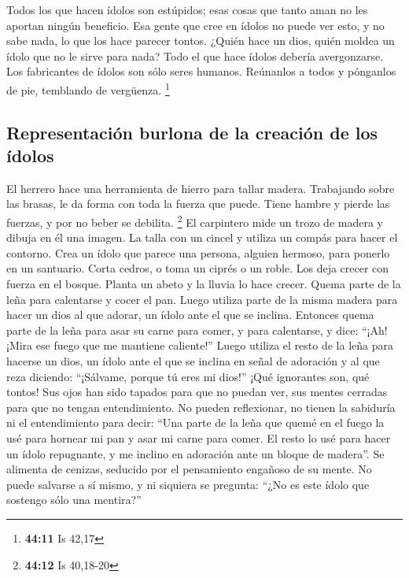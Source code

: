  Todos los que hacen ídolos son estúpidos; esas cosas que
tanto aman no les aportan ningún beneficio. Esa gente que cree en ídolos
no puede ver esto, y no sabe nada, lo que los hace parecer tontos.
 ¿Quién hace un dios, quién moldea un ídolo que no le
sirve para nada?  Todo el que hace ídolos debería
avergonzarse. Los fabricantes de ídolos son sólo seres humanos.
Reúnanlos a todos y pónganlos de pie, temblando de vergüenza.
\footnote{\textbf{44:11} Is 42,17}

\hypertarget{representaciuxf3n-burlona-de-la-creaciuxf3n-de-los-uxeddolos}{%
\subsection{Representación burlona de la creación de los
ídolos}\label{representaciuxf3n-burlona-de-la-creaciuxf3n-de-los-uxeddolos}}

 El herrero hace una herramienta de hierro para tallar
madera. Trabajando sobre las brasas, le da forma con toda la fuerza que
puede. Tiene hambre y pierde las fuerzas, y por no beber se debilita.
\footnote{\textbf{44:12} Is 40,18-20}  El carpintero mide
un trozo de madera y dibuja en él una imagen. La talla con un cincel y
utiliza un compás para hacer el contorno. Crea un ídolo que parece una
persona, alguien hermoso, para ponerlo en un santuario. 
Corta cedros, o toma un ciprés o un roble. Los deja crecer con fuerza en
el bosque. Planta un abeto y la lluvia lo hace crecer. 
Quema parte de la leña para calentarse y cocer el pan. Luego utiliza
parte de la misma madera para hacer un dios al que adorar, un ídolo ante
el que se inclina.  Entonces quema parte de la leña para
asar su carne para comer, y para calentarse, y dice: ``¡Ah! ¡Mira ese
fuego que me mantiene caliente!''  Luego utiliza el resto
de la leña para hacerse un dios, un ídolo ante el que se inclina en
señal de adoración y al que reza diciendo: ``¡Sálvame, porque tú eres mi
dios!''  ¡Qué ignorantes son, qué tontos! Sus ojos han
sido tapados para que no puedan ver, sus mentes cerradas para que no
tengan entendimiento.  No pueden reflexionar, no tienen
la sabiduría ni el entendimiento para decir: ``Una parte de la leña que
quemé en el fuego la usé para hornear mi pan y asar mi carne para comer.
El resto lo usé para hacer un ídolo repugnante, y me inclino en
adoración ante un bloque de madera''.  Se alimenta de
cenizas, seducido por el pensamiento engañoso de su mente. No puede
salvarse a sí mismo, y ni siquiera se pregunta: ``¿No es este ídolo que
sostengo sólo una mentira?''

